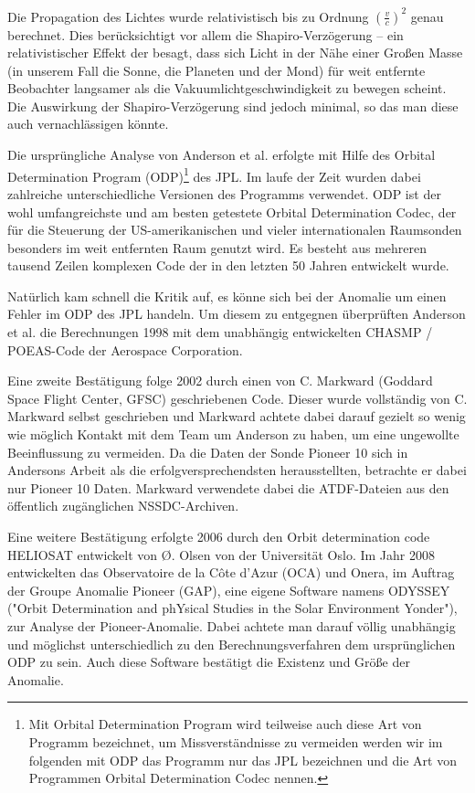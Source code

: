 Die Propagation des Lichtes wurde relativistisch bis zu Ordnung $(\frac{v}{c})^2$ genau berechnet.
Dies berücksichtigt vor allem die Shapiro-Verzögerung – ein relativistischer Effekt der besagt,
dass sich Licht in der Nähe einer Großen Masse (in unserem Fall die Sonne, die Planeten und der Mond) für weit entfernte Beobachter langsamer als die Vakuumlichtgeschwindigkeit zu bewegen scheint. %
Die Auswirkung der Shapiro-Verzögerung sind jedoch minimal,\cite{Levy2008} so das man diese auch vernachlässigen könnte.

Die ursprüngliche Analyse von Anderson et al. erfolgte mit Hilfe des Orbital Determination Program (ODP)\footnote{Mit Orbital Determination Program wird teilweise auch diese Art von Programm bezeichnet, um Missverständnisse zu vermeiden werden wir im folgenden mit ODP das Programm nur das JPL bezeichnen und die Art von Programmen Orbital Determination Codec nennen.} des JPL. Im laufe der Zeit wurden dabei zahlreiche unterschiedliche Versionen des Programms verwendet. ODP ist der wohl umfangreichste und am besten getestete Orbital Determination Codec, der für die Steuerung der US-amerikanischen und vieler internationalen Raumsonden besonders im weit entfernten Raum genutzt wird. Es besteht aus mehreren tausend Zeilen komplexen Code der in den letzten 50 Jahren entwickelt wurde.\cite{Turyshev2010}

Natürlich kam schnell die Kritik auf, es könne sich bei der Anomalie um einen Fehler im ODP des JPL handeln.
Um diesem zu entgegnen überprüften Anderson et al. die Berechnungen 1998 mit dem unabhängig entwickelten CHASMP / POEAS-Code der Aerospace Corporation.

Eine zweite Bestätigung folge 2002 durch einen von C. Markward (Goddard Space Flight Center, GFSC) geschriebenen
Code. Dieser wurde vollständig von C. Markward selbst geschrieben und Markward achtete dabei darauf gezielt so wenig wie möglich Kontakt mit dem Team um Anderson zu haben, um eine ungewollte Beeinflussung zu vermeiden.\cite{Markwardt2002} Da die Daten der Sonde Pioneer 10 sich in Andersons Arbeit als die erfolgversprechendsten herausstellten, betrachte er dabei nur Pioneer 10 Daten.\cite{Markwardt2002}
Markward verwendete dabei die ATDF-Dateien aus den öffentlich zugänglichen NSSDC-Archiven.

Eine weitere Bestätigung erfolgte 2006 durch den Orbit determination code HELIOSAT entwickelt von Ø. Olsen von der
Universität Oslo.\cite{Olsen2006}
Im Jahr 2008 entwickelten das Observatoire de la Côte d’Azur (OCA) und Onera, im Auftrag der Groupe Anomalie Pioneer (GAP),
eine eigene Software namens ODYSSEY ("Orbit Determination and phYsical Studies in the Solar Environment Yonder"), zur Analyse der Pioneer-Anomalie.
Dabei achtete man darauf völlig unabhängig und möglichst unterschiedlich zu den Berechnungsverfahren dem ursprünglichen ODP zu sein. 
Auch diese Software bestätigt die Existenz und Größe der Anomalie.\cite{Levy2008}

